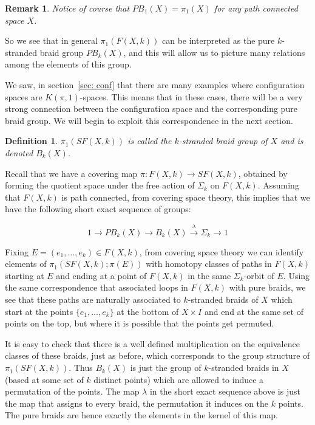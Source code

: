 \documentclass{amsart}
\newtheorem{rem}[thm]{Remark}
\newtheorem{defn}[thm]{Definition}
\begin{document}
\begin{rem}
Notice of course that $PB_1(X)=\pi_1(X)$ for any path connected space $X$.
\end{rem}

So we see that in general $\pi_1(F(X,k))$
can be interpreted as the pure $k$-stranded braid group $PB_k(X)$, and
this will allow us to picture many relations among the elements of this
group.

We saw, in section~\ref{sec: conf} that there are many examples where
configuration spaces are $K(\pi, 1)$-spaces. This means that
in these cases, there will be a very strong connection between the 
configuration space
and the corresponding pure braid group. We will begin to exploit this
correspondence in the next section.

\begin{defn}
$\pi_1(SF(X,k))$ is called the $k$-stranded braid group of $X$ and
is denoted $B_k(X)$.
\end{defn}

Recall that we have a covering map $\pi : F(X,k) \rightarrow SF(X,k)$,
obtained by forming the quotient space under the free action of $\Sigma_k$
on $F(X,k)$. Assuming that $F(X,k)$ is path connected, from covering space 
theory, 
this implies that we have the
following short exact sequence of groups:

$$
1 \rightarrow PB_k(X) \rightarrow B_k(X) 
\overset{\lambda}{\rightarrow}
 \Sigma_k 
\rightarrow 1
$$

Fixing $E=(e_1,\dots,e_k) \in F(X,k)$, from covering space theory we can 
identify
elements of $\pi_1(SF(X,k) ; \pi(E))$ with homotopy classes of 
paths in $F(X,k)$ starting at
$E$ and ending at a point of $F(X,k)$ in the same $\Sigma_k$-orbit of $E$.
Using the same correspondence that associated loops in $F(X,k)$ with
pure braids, we see that these paths are naturally associated to $k$-stranded
braids of $X$ which start at the points $\{e_1, \dots, e_k \}$ at the bottom
of $X \times I$ and end at the same set of points on the top, but where
it is possible that the points get permuted. 

It is easy to check that there is a well defined multiplication on the 
equivalence classes of these braids, just as before, which corresponds
to the group structure of $\pi_1(SF(X,k))$. Thus $B_k(X)$ is just the
group of $k$-stranded braids in $X$ (based at some set of $k$ distinct points) 
which are allowed to induce a permutation of the points. The map $\lambda$
in the short exact sequence above is just the map that assigns to every
braid, the permutation it induces on the $k$ points. The pure braids
are hence exactly the elements in the kernel of this map. 
\end{document}
